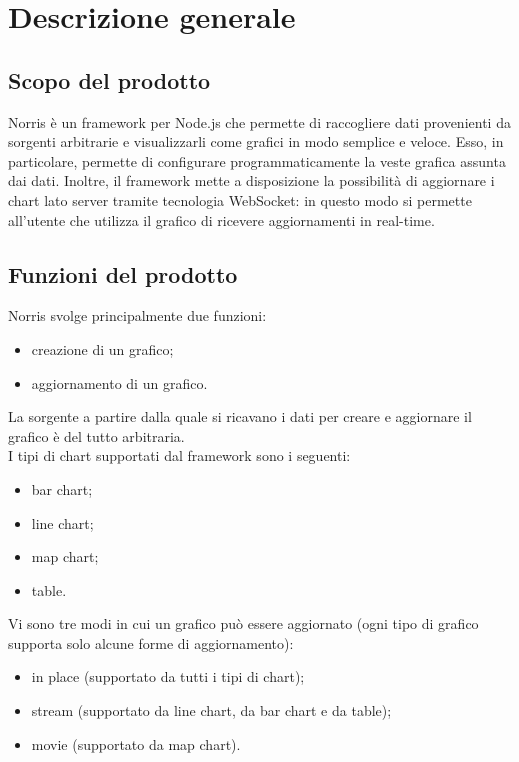 \section{Descrizione generale}
	\subsection{Scopo del prodotto}
		Norris è un framework per Node.js che permette di raccogliere dati provenienti da sorgenti arbitrarie e visualizzarli come grafici in modo semplice e veloce. Esso, in particolare, permette di configurare programmaticamente la veste grafica assunta dai dati. Inoltre, il framework mette a disposizione la possibilità di aggiornare i chart lato server tramite tecnologia WebSocket: in questo modo si permette all'utente che utilizza il grafico di ricevere aggiornamenti in real-time.
	\subsection{Funzioni del prodotto}
		Norris svolge principalmente due funzioni:
		\begin{itemize}
			\item creazione di un grafico;
			\item aggiornamento di un grafico.
		\end{itemize}
		La sorgente a partire dalla quale si ricavano i dati per creare e aggiornare il grafico è del tutto arbitraria.\\
		I tipi di chart supportati dal framework sono i seguenti:
		\begin{itemize}
			\item bar chart;
			\item line chart;
			\item map chart;
			\item table.
		\end{itemize}
		Vi sono tre modi in cui un grafico può essere aggiornato (ogni tipo di grafico supporta solo alcune forme di aggiornamento):
		\begin{itemize}
			\item in place (supportato da tutti i tipi di chart);
			\item stream (supportato da line chart, da bar chart e da table);
			\item movie (supportato da map chart).
		\end{itemize}
